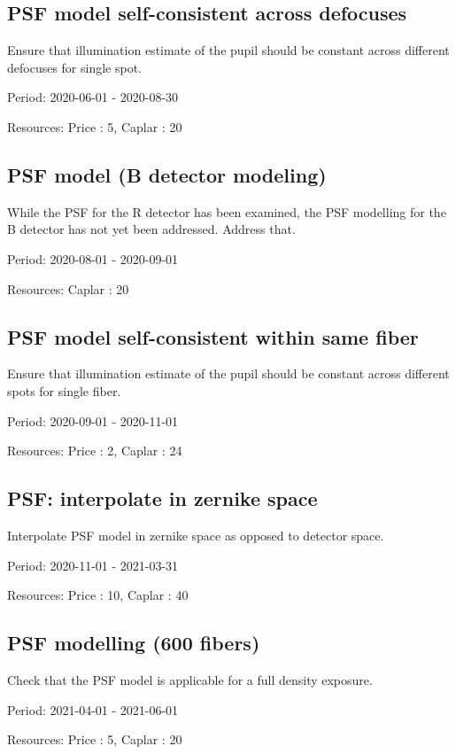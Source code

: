 \subsection{PSF model self-consistent across defocuses}

Ensure that illumination estimate of the pupil should be constant across different defocuses for single spot.

Period: 2020-06-01 - 2020-08-30

Resources: Price : 5, Caplar : 20

\subsection{PSF model (B detector modeling)}

While the PSF for the R detector has been examined, the PSF modelling for the B detector has not yet been addressed. Address that.

Period: 2020-08-01 - 2020-09-01

Resources: Caplar : 20

\subsection{PSF model self-consistent within same fiber}

Ensure that illumination estimate of the pupil should be constant across different spots for single fiber.

Period: 2020-09-01 - 2020-11-01

Resources: Price : 2, Caplar : 24

\subsection{PSF: interpolate in zernike space}

Interpolate PSF model in zernike space as opposed to detector space.

Period: 2020-11-01 - 2021-03-31

Resources: Price : 10, Caplar : 40

\subsection{PSF modelling (600 fibers)}

Check that the PSF model is applicable for a full density exposure.

Period: 2021-04-01 - 2021-06-01

Resources: Price : 5, Caplar : 20

